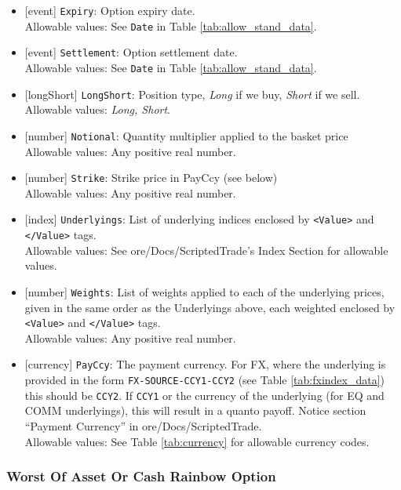 \begin{itemize}
    \item{}[event] \lstinline!Expiry!: Option expiry date. \\
    Allowable values: See \lstinline!Date! in Table \ref{tab:allow_stand_data}.
    \item{}[event] \lstinline!Settlement!: Option settlement date. \\
    Allowable values: See \lstinline!Date! in Table \ref{tab:allow_stand_data}.
    \item{}[longShort] \lstinline!LongShort!: Position type,
          {\em Long} if we buy, {\em Short} if we sell.\\
    Allowable values: \emph{Long, Short}.
        \item{}[number] \lstinline!Notional!: Quantity multiplier applied to the
          basket price \\
          Allowable values: Any positive real number.
        \item{}[number] \lstinline!Strike!: Strike price in PayCcy (see
          below) \\
          Allowable values: Any positive real number.
    \item{}[index] \lstinline!Underlyings!: List of underlying indices
          enclosed by {\tt <Value>} and {\tt </Value>} tags. \\
          Allowable values: See ore/Docs/ScriptedTrade's Index Section for allowable values.
    \item{}[number] \lstinline!Weights!: List of weights applied to each of
          the underlying prices, given in the same order as
          the Underlyings above, each weighted enclosed by {\tt <Value>} and {\tt </Value>} tags.\\
          Allowable values: Any positive real number.
    \item{}[currency] \lstinline!PayCcy!: The payment currency. For FX, where the underlying is provided
      in the form \lstinline!FX-SOURCE-CCY1-CCY2! (see Table \ref{tab:fxindex_data}) this should
      be \lstinline!CCY2!. If \lstinline!CCY1! or the currency of the underlying (for EQ and
      COMM underlyings), this will result in a quanto payoff. Notice section ``Payment Currency'' in ore/Docs/ScriptedTrade. \\
        Allowable values: See Table \ref{tab:currency} for allowable currency codes.
\end{itemize}

\subsubsection*{Worst Of Asset Or Cash Rainbow Option}

